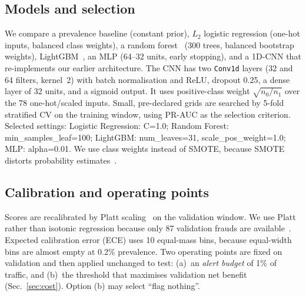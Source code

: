 \documentclass[conference]{IEEEtran}
\begin{document}
\subsection{Models and selection}\label{sec:models}
We compare a prevalence baseline (constant prior), $L_2$ logistic regression (one-hot inputs, balanced class weights), a random forest~\cite{breiman2001} (300 trees, balanced bootstrap weights), LightGBM~\cite{ke2017}, an MLP (64--32 units, early stopping), and a 1D-CNN that re-implements our earlier architecture. The CNN has two \texttt{Conv1d} layers (32 and 64 filters, kernel~2) with batch normalisation and ReLU, dropout 0.25, a dense layer of 32 units, and a sigmoid output. It uses positive-class weight $\sqrt{n_0/n_1}$ over the 78 one-hot/scaled inputs. Small, pre-declared grids are searched by 5-fold stratified CV on the training window, using PR-AUC as the selection criterion. Selected settings: Logistic Regression: C=1.0; Random Forest: min\_samples\_leaf=100; LightGBM: num\_leaves=31, scale\_pos\_weight=1.0; MLP: alpha=0.01. We use class weights instead of SMOTE, because SMOTE distorts probability estimates~\cite{dalpozzolo2015}.

\subsection{Calibration and operating points}
Scores are recalibrated by Platt scaling~\cite{platt1999} on the validation window. We use Platt rather than isotonic regression because only 87 validation frauds are available~\cite{niculescu2005}. Expected calibration error (ECE) uses 10 equal-mass bins, because equal-width bins are almost empty at 0.2\% prevalence. Two operating points are fixed on validation and then applied unchanged to test: (a)~an \emph{alert budget} of 1\% of traffic, and (b)~the threshold that maximises validation net benefit (Sec.~\ref{sec:cost}). Option (b) may select ``flag nothing''.
\end{document}
